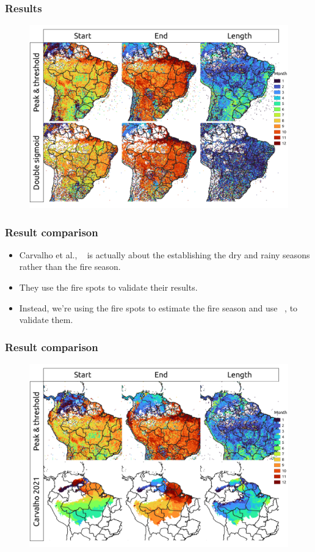 \documentclass[aspectratio=169]{beamer}
\begin{document}
\begin{frame}
    \frametitle{Results}
    \begin{figure}[h]
        \includegraphics[width=0.75\linewidth]
        {./images/pthres_vs_dsig.png}
    \end{figure}
\end{frame}

\begin{frame}
    \frametitle{Result comparison}
    \begin{itemize}
        \item Carvalho et al., ~\cite{carvalho2021} is actually about the
            establishing the dry and rainy seasons rather than the fire season.
        \item They use the fire spots to validate their results.
        \item Instead, we're using the fire spots to estimate the fire season
            and use ~\cite{carvalho2021}, to validate them.
    \end{itemize}
\end{frame}

\begin{frame}
    \frametitle{Result comparison}
    \begin{figure}[h]
        \includegraphics[width=0.75\linewidth]
        {./images/pthres_vs_carvalho2021.png}
    \end{figure}
\end{frame}
\end{document}
